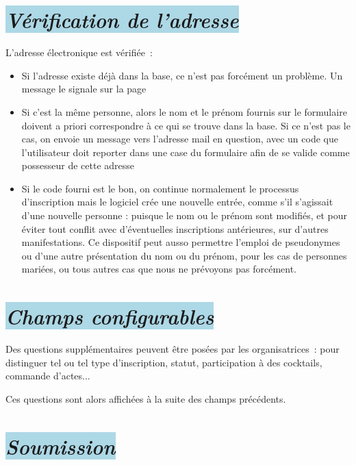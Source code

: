 \documentclass[10pt,a4paper]{article}
\newcommand{\bleupale}[1]{\colorbox{LightBlue}{#1}}
\begin{document}
\section*{\bleupale{\emph{Vérification de l'adresse}}}

L'adresse électronique est vérifiée :
\begin{itemize}
  \item Si l'adresse existe déjà dans la base, ce n'est pas forcément un problème. Un message le signale sur la page
  \item Si c'est la même personne, alors le nom et le prénom fournis sur le formulaire doivent a priori correspondre à ce qui se trouve dans la base. Si ce n'est pas le cas, on envoie un message vers l'adresse mail en question, avec un code que l'utilisateur doit reporter dans une case du formulaire afin de se valide comme possesseur de cette adresse
  \item Si le code fourni est le bon, on continue normalement le processus d'inscription mais le logiciel crée une nouvelle entrée, comme s'il s'agissait d'une nouvelle personne : puisque le nom ou le prénom sont modifiés, et pour éviter tout conflit avec d'éventuelles inscriptions antérieures, sur d'autres manifestations. Ce dispositif peut ausso permettre l'emploi de pseudonymes ou d'une autre présentation du nom ou du prénom, pour les cas de personnes mariées, ou tous autres cas que nous ne prévoyons pas forcément.
  \end{itemize}

\section*{\bleupale{\emph{Champs configurables}}}

Des questions supplémentaires peuvent être posées par les organisatrices : pour distinguer tel ou tel type d'inscription, statut, participation à des cocktails, commande d'actes...

Ces questions sont alors affichées à la suite des champs précédents.

\section*{\bleupale{\emph{Soumission}}}
\end{document}
